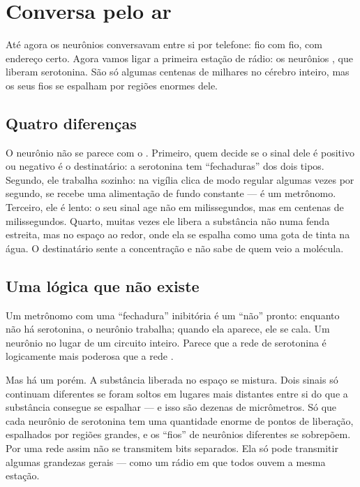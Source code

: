 \chapter{Conversa pelo ar}


Até agora os neurônios conversavam entre si por telefone: fio com fio, com endereço certo. Agora vamos ligar a primeira estação de rádio: os neurônios , que liberam serotonina. São só algumas centenas de milhares no cérebro inteiro, mas os seus fios se espalham por regiões enormes dele.

\section*{Quatro diferenças}

O neurônio  não se parece com o . Primeiro, quem decide se o sinal dele é positivo ou negativo é o destinatário: a serotonina tem ``fechaduras'' dos dois tipos. Segundo, ele trabalha sozinho: na vigília clica de modo regular algumas vezes por segundo, se recebe uma alimentação de fundo constante --- é um metrônomo. Terceiro, ele é lento: o seu sinal age não em milissegundos, mas em centenas de milissegundos. Quarto, muitas vezes ele libera a substância não numa fenda estreita, mas no espaço ao redor, onde ela se espalha como uma gota de tinta na água. O destinatário sente a concentração e não sabe de quem veio a molécula.

\section*{Uma lógica que não existe}

Um metrônomo com uma ``fechadura'' inibitória é um ``não'' pronto: enquanto não há serotonina, o neurônio trabalha; quando ela aparece, ele se cala. Um neurônio no lugar de um circuito inteiro. Parece que a rede de serotonina é logicamente mais poderosa que a rede .

Mas há um porém. A substância liberada no espaço se mistura. Dois sinais só continuam diferentes se foram soltos em lugares mais distantes entre si do que a substância consegue se espalhar --- e isso são dezenas de micrômetros. Só que cada neurônio de serotonina tem uma quantidade enorme de pontos de liberação, espalhados por regiões grandes, e os ``fios'' de neurônios diferentes se sobrepõem. Por uma rede assim não se transmitem bits separados. Ela só pode transmitir algumas grandezas gerais --- como um rádio em que todos ouvem a mesma estação.

